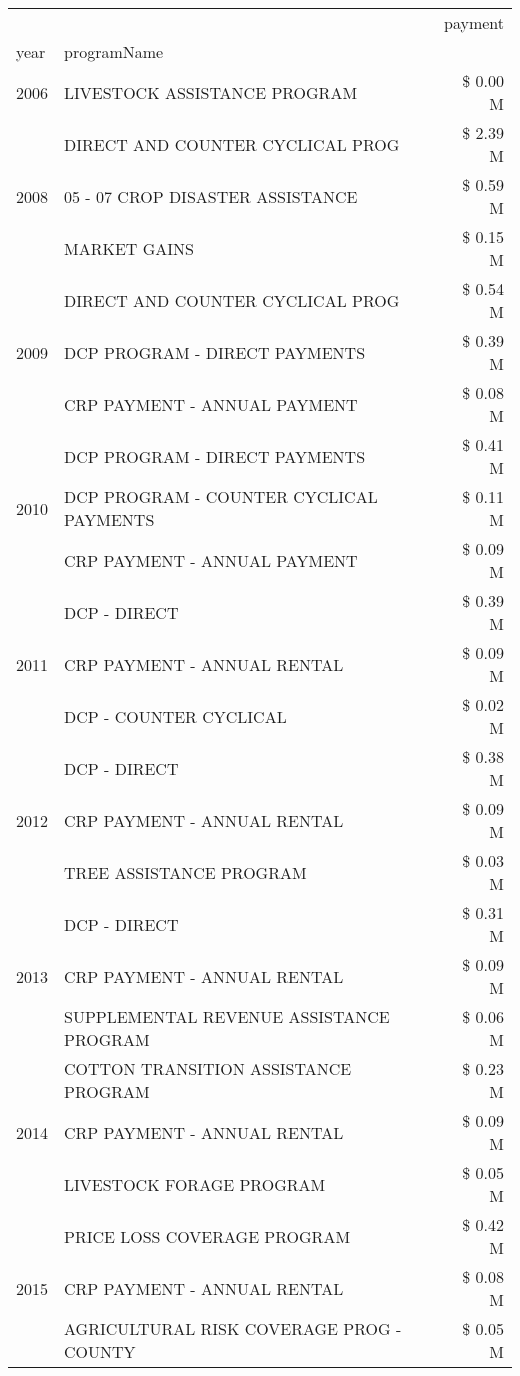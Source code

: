 \begin{tabular}{llr}
\toprule
 &  & payment \\
year & programName &  \\
\midrule
2006 & LIVESTOCK ASSISTANCE PROGRAM & \$ 0.00 M \\
\cline{1-3}
\multirow[t]{3}{*}{2008} & DIRECT AND COUNTER CYCLICAL PROG & \$ 2.39 M \\
 & 05 - 07 CROP DISASTER ASSISTANCE & \$ 0.59 M \\
 & MARKET GAINS & \$ 0.15 M \\
\cline{1-3}
\multirow[t]{3}{*}{2009} & DIRECT AND COUNTER CYCLICAL PROG & \$ 0.54 M \\
 & DCP PROGRAM - DIRECT PAYMENTS & \$ 0.39 M \\
 & CRP PAYMENT - ANNUAL PAYMENT & \$ 0.08 M \\
\cline{1-3}
\multirow[t]{3}{*}{2010} & DCP PROGRAM - DIRECT PAYMENTS & \$ 0.41 M \\
 & DCP PROGRAM - COUNTER CYCLICAL PAYMENTS & \$ 0.11 M \\
 & CRP PAYMENT - ANNUAL PAYMENT & \$ 0.09 M \\
\cline{1-3}
\multirow[t]{3}{*}{2011} & DCP - DIRECT & \$ 0.39 M \\
 & CRP PAYMENT - ANNUAL RENTAL & \$ 0.09 M \\
 & DCP - COUNTER CYCLICAL & \$ 0.02 M \\
\cline{1-3}
\multirow[t]{3}{*}{2012} & DCP - DIRECT & \$ 0.38 M \\
 & CRP PAYMENT - ANNUAL RENTAL & \$ 0.09 M \\
 & TREE ASSISTANCE PROGRAM & \$ 0.03 M \\
\cline{1-3}
\multirow[t]{3}{*}{2013} & DCP - DIRECT & \$ 0.31 M \\
 & CRP PAYMENT - ANNUAL RENTAL & \$ 0.09 M \\
 & SUPPLEMENTAL REVENUE ASSISTANCE PROGRAM & \$ 0.06 M \\
\cline{1-3}
\multirow[t]{3}{*}{2014} & COTTON TRANSITION ASSISTANCE PROGRAM & \$ 0.23 M \\
 & CRP PAYMENT - ANNUAL RENTAL & \$ 0.09 M \\
 & LIVESTOCK FORAGE PROGRAM & \$ 0.05 M \\
\cline{1-3}
\multirow[t]{3}{*}{2015} & PRICE LOSS COVERAGE PROGRAM & \$ 0.42 M \\
 & CRP PAYMENT - ANNUAL RENTAL & \$ 0.08 M \\
 & AGRICULTURAL RISK COVERAGE PROG - COUNTY & \$ 0.05 M \\

\end{tabular}
